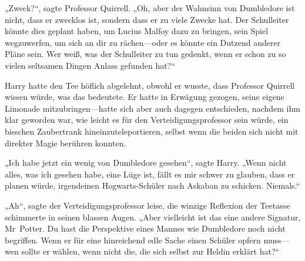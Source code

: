 „Zweck?“, sagte Professor Quirrell. „Oh, aber der Wahnsinn von Dumbledore ist nicht, dass er zwecklos ist, sondern dass er zu viele Zwecke hat. Der Schulleiter könnte dies geplant haben, um Lucius Malfoy dazu zu bringen, sein Spiel wegzuwerfen, um sich an dir zu rächen—oder es könnte ein Dutzend anderer Pläne sein. Wer weiß, was der Schulleiter zu tun gedenkt, wenn er schon zu so vielen seltsamen Dingen Anlass gefunden hat?“

Harry hatte den Tee höflich abgelehnt, obwohl er wusste, dass Professor Quirrell wissen würde, was das bedeutete. Er hatte in Erwägung gezogen, seine eigene Limonade mitzubringen—hatte sich aber auch dagegen entschieden, nachdem ihm klar geworden war, wie leicht es für den Verteidigungsprofessor sein würde, ein bisschen Zaubertrank hineinzuteleportieren, selbst wenn die beiden sich nicht mit direkter Magie berühren konnten.

„Ich habe jetzt ein wenig von Dumbledore gesehen“, sagte Harry. „Wenn nicht alles, was ich gesehen habe, eine Lüge ist, fällt es mir schwer zu glauben, dass er planen würde, irgendeinen Hogwarts-Schüler nach Askaban zu schicken. Niemals.“

„Ah“, sagte der Verteidigungsprofessor leise, die winzige Reflexion der Teetasse schimmerte in seinen blassen Augen. „Aber vielleicht ist das eine andere Signatur, Mr~Potter. Du hast die Perspektive eines Mannes wie Dumbledore noch nicht begriffen. Wenn er für eine hinreichend edle Sache einen Schüler opfern muss—wen sollte er wählen, wenn nicht die, die sich selbst zur Heldin erklärt hat?“

